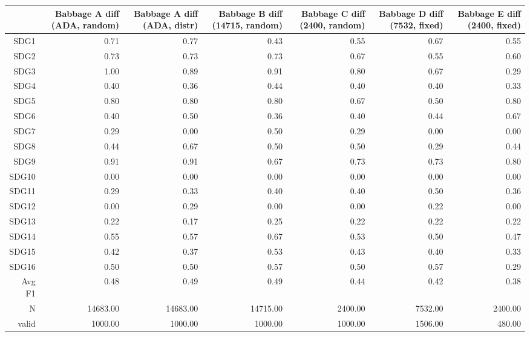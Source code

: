 \begin{table}[ht]
\centering
\begin{tabular}{rrrrrrr}
  \hline
 & Babbage A diff (ADA, random) & Babbage A diff (ADA, distr) & Babbage B diff (14715, random) & Babbage C diff (2400, random) & Babbage D diff (7532, fixed) & Babbage E diff (2400, fixed) \\ 
  \hline
SDG1 & 0.71 & 0.77 & 0.43 & 0.55 & 0.67 & 0.55 \\ 
  SDG2 & 0.73 & 0.73 & 0.73 & 0.67 & 0.55 & 0.60 \\ 
  SDG3 & 1.00 & 0.89 & 0.91 & 0.80 & 0.67 & 0.29 \\ 
  SDG4 & 0.40 & 0.36 & 0.44 & 0.40 & 0.40 & 0.33 \\ 
  SDG5 & 0.80 & 0.80 & 0.80 & 0.67 & 0.50 & 0.80 \\ 
  SDG6 & 0.40 & 0.50 & 0.36 & 0.40 & 0.44 & 0.67 \\ 
  SDG7 & 0.29 & 0.00 & 0.50 & 0.29 & 0.00 & 0.00 \\ 
  SDG8 & 0.44 & 0.67 & 0.50 & 0.50 & 0.29 & 0.44 \\ 
  SDG9 & 0.91 & 0.91 & 0.67 & 0.73 & 0.73 & 0.80 \\ 
  SDG10 & 0.00 & 0.00 & 0.00 & 0.00 & 0.00 & 0.00 \\ 
  SDG11 & 0.29 & 0.33 & 0.40 & 0.40 & 0.50 & 0.36 \\ 
  SDG12 & 0.00 & 0.29 & 0.00 & 0.00 & 0.22 & 0.00 \\ 
  SDG13 & 0.22 & 0.17 & 0.25 & 0.22 & 0.22 & 0.22 \\ 
  SDG14 & 0.55 & 0.57 & 0.67 & 0.53 & 0.50 & 0.47 \\ 
  SDG15 & 0.42 & 0.37 & 0.53 & 0.43 & 0.40 & 0.33 \\ 
  SDG16 & 0.50 & 0.50 & 0.57 & 0.50 & 0.57 & 0.29 \\ 
  Avg F1 & 0.48 & 0.49 & 0.49 & 0.44 & 0.42 & 0.38 \\ 
  N & 14683.00 & 14683.00 & 14715.00 & 2400.00 & 7532.00 & 2400.00 \\ 
  valid & 1000.00 & 1000.00 & 1000.00 & 1000.00 & 1506.00 & 480.00 \\ 
   \hline
\end{tabular}
\end{table}
